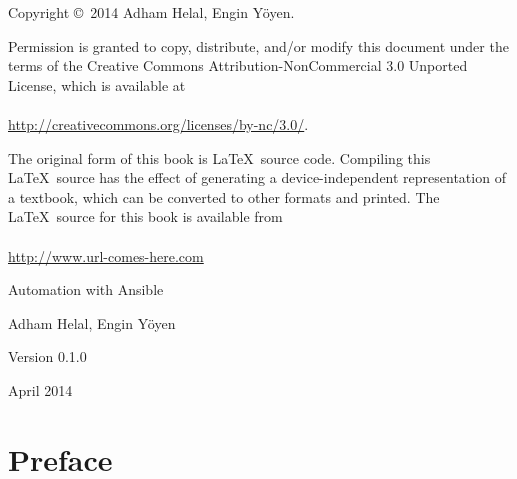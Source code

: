 \documentclass[10pt]{book}
\newcommand{\thetitle}{Automation with Ansible}
\newcommand{\theversion}{0.1.0}
\newcommand{\thedate}{April 2014}
\begin{document}
\begin{latexonly}

\pagebreak
\thispagestyle{empty}

{\small
Copyright \copyright~2014 Adham Helal, Engin Yöyen.


\vspace{0.2in}



Permission is granted to copy, distribute, and/or modify this document
under the terms of the Creative Commons Attribution-NonCommercial 3.0 Unported
License, which is available at 
\\
\\
\url{http://creativecommons.org/licenses/by-nc/3.0/}.

The original form of this book is \LaTeX\ source code.  Compiling this
\LaTeX\ source has the effect of generating a device-independent
representation of a textbook, which can be converted to other formats
and printed. The \LaTeX\ source for this book is available from
\\
\\
\url{http://www.url-comes-here.com}


\vspace{0.2in}

} %

\end{latexonly}



\begin{htmlonly}


{\Large \thetitle}

{\large Adham Helal, Engin Yöyen}

Version \theversion

\thedate

\setcounter{chapter}{-1}

\end{htmlonly}

\fi



\chapter{Preface}
\end{document}
